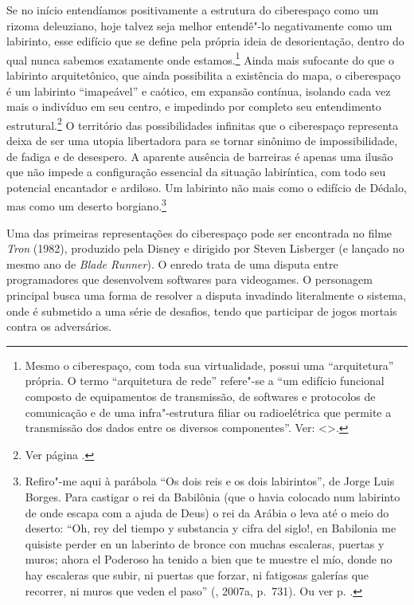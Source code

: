 Se no início entendíamos positivamente a estrutura do ciberespaço como
um rizoma deleuziano, hoje talvez seja melhor entendê"-lo
negativamente como um labirinto, esse edifício que se define pela
própria ideia de desorientação, dentro do qual nunca sabemos exatamente
onde estamos.\footnote{Mesmo o ciberespaço, com toda sua virtualidade,
  possui uma ``arquitetura'' própria. O termo ``arquitetura de rede''
  refere"-se a ``um edifício funcional composto de equipamentos de
  transmissão, de softwares e protocolos de comunicação e de uma
  infra"-estrutura filiar ou radioelétrica que permite a transmissão dos
  dados entre os diversos componentes''. Ver: \textless{}{}\textgreater{}.} Ainda
mais sufocante do que o labirinto arquitetônico, que ainda possibilita a
existência do mapa, o ciberespaço é um labirinto ``imapeável'' e
caótico, em expansão contínua, isolando cada vez mais o indivíduo em seu
centro, e impedindo por completo seu entendimento estrutural.\footnote{Ver
  página .} O território das possibilidades infinitas que o
ciberespaço representa deixa de ser uma utopia libertadora para se
tornar sinônimo de impossibilidade, de fadiga e de desespero. A aparente ausência
de barreiras é apenas uma ilusão que não impede a configuração
essencial da situação labiríntica, com todo seu potencial encantador e
ardiloso. Um labirinto não mais como o edifício de Dédalo, mas como um
deserto borgiano.\footnote{Refiro"-me aqui à parábola ``Os dois reis e os
  dois labirintos'', de Jorge Luis Borges. Para castigar o rei da
  Babilônia (que o havia colocado num labirinto de onde escapa com a
  ajuda de Deus) o rei da Arábia o leva até o meio do deserto: ``Oh, rey
  del tiempo y substancia y cifra del siglo!, en Babilonia me quisiste
  perder en un laberinto de bronce con muchas escaleras, puertas y
  muros; ahora el Poderoso ha tenido a bien que te muestre el mío, donde
  no hay escaleras que subir, ni puertas que forzar, ni fatigosas
  galerías que recorrer, ni muros que veden el paso'' (, 2007a, p.~731). Ou ver p. \pageref{borges}.}

Uma das primeiras representações do ciberespaço pode ser encontrada no
filme \emph{Tron} (1982), produzido pela Disney e dirigido por Steven
Lisberger (e lançado no mesmo ano de \emph{Blade Runner}). O enredo
trata de uma disputa entre programadores que desenvolvem softwares para
videogames. O personagem principal busca uma forma de resolver a disputa
invadindo literalmente o sistema, onde é submetido a uma série de
desafios, tendo que participar de jogos mortais contra os adversários.


